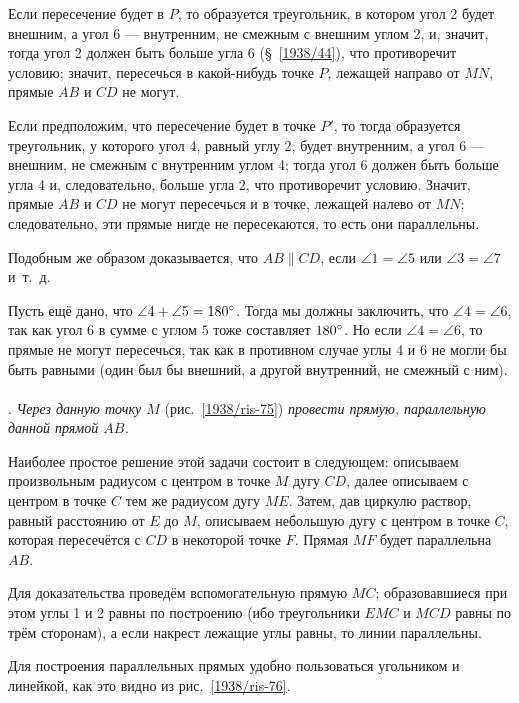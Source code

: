 \documentclass[twoside]{book}
\begin{document}
Если пересечение будет в $P$, то образуется треугольник, в котором угол 2 будет внешним, а угол 6 — внутренним, не смежным с внешним углом 2, и, значит, тогда угол 2 должен быть больше угла 6 (§~\ref{1938/44}), что противоречит условию;
значит, пересечься в какой-нибудь точке $P$, лежащей направо от $MN$, прямые $AB$ и $CD$ не могут.

Если предположим, что пересечение будет в точке $P'$, то тогда образуется треугольник, у которого угол 4, равный углу 2, будет внутренним, а угол 6 — внешним, не смежным с внутренним углом 4;
тогда угол 6 должен быть больше угла 4 и, следовательно, больше угла 2, что противоречит условию.
Значит, прямые $AB$ и $CD$ не могут пересечься и в точке, лежащей налево от $MN$;
следовательно, эти прямые нигде не пересекаются, то есть они параллельны.

Подобным же образом доказывается, что $AB \parallel CD$, если $\angle 1 = \angle 5$ или $\angle 3 = \angle 7$ и~т.~д.

Пусть ещё дано, что $\angle 4 + \angle 5 = 180\degree$.
Тогда мы должны заключить, что $\angle 4 = \angle 6$, так как угол $6$ в сумме с углом $5$ тоже составляет $180\degree$.
Но если $\angle 4 = \angle 6$, то прямые не могут пересечься, так как в противном случае углы 4 и 6 не могли бы быть равными (один был бы внешний, а другой внутренний, не смежный с ним).

\paragraph{}\label{1938/74}
.
\emph{Через данную точку $M$} (рис.~\ref{1938/ris-75}) \emph{провести прямую, параллельную данной прямой $AB$.}

Наиболее простое решение этой задачи состоит в следующем:
описываем произвольным радиусом с центром в точке $M$ дугу $CD$, далее описываем с центром в точке $C$ тем же радиусом дугу $ME$.
Затем, дав циркулю раствор, равный расстоянию от $E$ до $M$, описываем небольшую дугу с центром в точке $C$, которая пересечётся с $CD$ в некоторой точке $F$.
Прямая $MF$ будет параллельна $AB$.

Для доказательства проведём вспомогательную прямую $MC$;
образовавшиеся при этом углы 1 и 2 равны по построению (ибо треугольники $EMC$ и $MCD$ равны по трём сторонам), а если накрест лежащие углы равны, то линии параллельны.

Для построения параллельных прямых удобно пользоваться угольником и линейкой, как это видно из рис.~\ref{1938/ris-76}.
\end{document}
